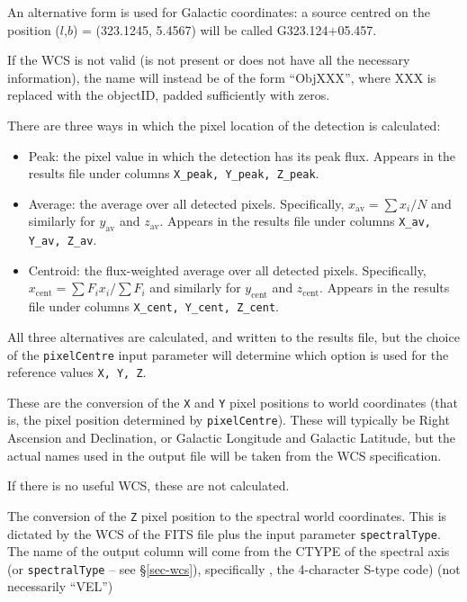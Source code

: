 An alternative form is used for Galactic coordinates: a source centred
on the position ($l$,$b$) = (323.1245, 5.4567) will be called
G323.124$+$05.457. 

If the WCS is not valid (\ie is not present or does not have all the
necessary information), the name will instead be of the form
``ObjXXX'', where XXX is replaced with the objectID, padded
sufficiently with zeros.


There are three ways in which the pixel location of the detection is
calculated: 
\begin{itemize}
\item Peak: the pixel value in which the detection has its peak
  flux. Appears in the results file under columns \texttt{X\_peak,
    Y\_peak, Z\_peak}.
\item Average: the average over all detected pixels. Specifically,
  $x_\text{av}=\sum x_i / N$ and similarly for $y_\text{av}$ and
  $z_\text{av}$. Appears in the results file under columns \texttt{X\_av,
    Y\_av, Z\_av}.
\item Centroid: the flux-weighted average over all detected pixels. Specifically,
  $x_\text{cent}=\sum F_i x_i / \sum F_i$ and similarly for $y_\text{cent}$ and
  $z_\text{cent}$. Appears in the results file under columns \texttt{X\_cent,
    Y\_cent, Z\_cent}.
\end{itemize}

All three alternatives are calculated, and written to the results
file, but the choice of the \texttt{pixelCentre} input parameter will
determine which option is used for the reference values \texttt{X, Y,
  Z}.


These are the conversion of the \texttt{X} and \texttt{Y} pixel
positions to world coordinates (that is, the pixel position determined
by \texttt{pixelCentre}). These will typically be Right Ascension and
Declination, or Galactic Longitude and Galactic Latitude, but the
actual names used in the output file will be taken from the WCS
specification. 

If there is no useful WCS, these are not calculated.

\label{sec-vel}

The conversion of the \texttt{Z} pixel position to the spectral world
coordinates. This is dictated by the WCS of the FITS file plus the
input parameter \texttt{spectralType}. The name of the output column
will come from the CTYPE of the spectral axis (or
\texttt{spectralType} -- see \S\ref{sec-wcs}), specifically , the
  4-character S-type code) (\ie not necessarily ``VEL'')

